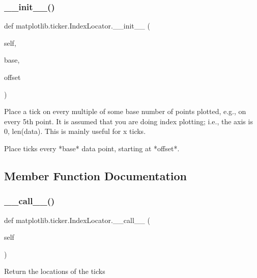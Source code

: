 \subsubsection{\texorpdfstring{\+\_\+\+\_\+init\+\_\+\+\_\+()}{\_\_init\_\_()}}
{\footnotesize\ttfamily def matplotlib.\+ticker.\+Index\+Locator.\+\_\+\+\_\+init\+\_\+\+\_\+ (\begin{DoxyParamCaption}\item[{}]{self,  }\item[{}]{base,  }\item[{}]{offset }\end{DoxyParamCaption})}

\begin{DoxyVerb}Place a tick on every multiple of some base number of points
plotted, e.g., on every 5th point.  It is assumed that you are doing
index plotting; i.e., the axis is 0, len(data).  This is mainly
useful for x ticks.
\end{DoxyVerb}
\begin{DoxyVerb}Place ticks every *base* data point, starting at *offset*.\end{DoxyVerb}
 

\subsection{Member Function Documentation}
\mbox{\label{classmatplotlib_1_1ticker_1_1IndexLocator_ae3dd74918d7b95809b72948d0416370d}} 
\subsubsection{\texorpdfstring{\+\_\+\+\_\+call\+\_\+\+\_\+()}{\_\_call\_\_()}}
{\footnotesize\ttfamily def matplotlib.\+ticker.\+Index\+Locator.\+\_\+\+\_\+call\+\_\+\+\_\+ (\begin{DoxyParamCaption}\item[{}]{self }\end{DoxyParamCaption})}

\begin{DoxyVerb}Return the locations of the ticks\end{DoxyVerb}
 \mbox{\label{classmatplotlib_1_1ticker_1_1IndexLocator_ad27200f01de57f73e9fc96f360a85946}} 

